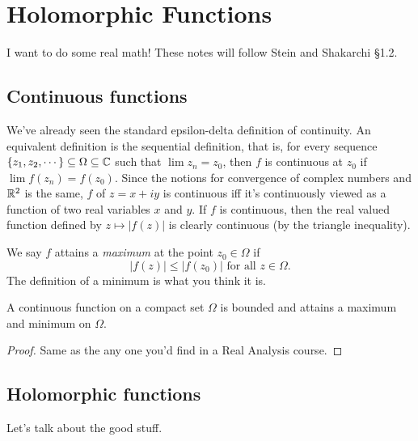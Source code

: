\section{Holomorphic Functions}
I want to do some real math! These notes will follow Stein and Shakarchi \S 1.2.
\subsection{Continuous functions}
We've already seen the standard epsilon-delta definition of continuity. An equivalent definition is the sequential definition, that is, for every sequence $\{z_1,z_2,\cdots\} \subseteq \Omega \subseteq \mathbb{C}$ such that $\lim z_n=z_0$, then $f$ is continuous at $z_0$ if $\lim f(z_n)=f(z_0)$. Since the notions for convergence of complex numbers and $\mathbb{R}^2$ is the same, $f$ of $z=x+iy$ is continuous iff it's continuously viewed as a function of two real variables $x$ and $y$. If $f$ is continuous, then the real valued function defined by $z\mapsto |f(z)|$ is clearly continuous (by the triangle inequality).

We say $f$ attains a \emph{maximum} at the point $z_0\in \Omega$ if \[
    |f(z)|\leq |f(z_0)| \,\,\text{for all}\,\,  z\in \Omega.
\] The definition of a minimum is what you think it is.
\begin{theorem}
    A continuous function on a compact set $\Omega$ is bounded and attains a maximum and minimum on $\Omega$.
\end{theorem}
\begin{proof}
    Same as the any one you'd find in a Real Analysis course.
\end{proof}
\subsection{Holomorphic functions}
Let's talk about the good stuff.


